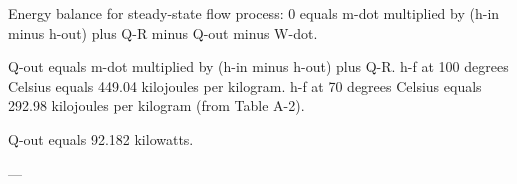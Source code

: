 Energy balance for steady-state flow process:  
0 equals m-dot multiplied by (h-in minus h-out) plus Q-R minus Q-out minus W-dot.  

Q-out equals m-dot multiplied by (h-in minus h-out) plus Q-R.  
h-f at 100 degrees Celsius equals 449.04 kilojoules per kilogram.  
h-f at 70 degrees Celsius equals 292.98 kilojoules per kilogram (from Table A-2).  

Q-out equals 92.182 kilowatts.  

---